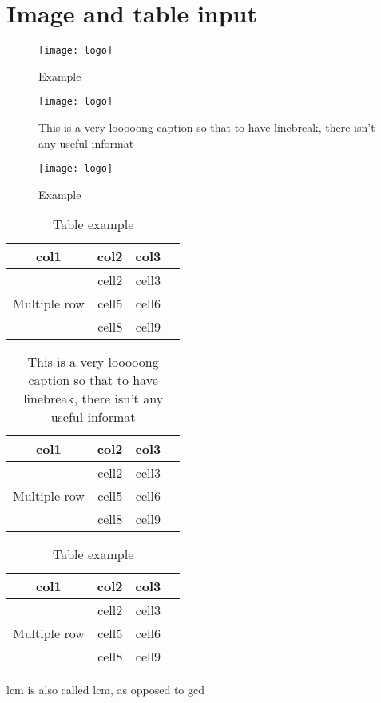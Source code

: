 \section{Image and table input}

\begin{figure}[H]
 \centering
 \texttt{[image: logo]}
 \caption{Example} 
\end{figure}

\begin{figure}[H]
 \centering
 \texttt{[image: logo]}
 \caption{This is a very looooong caption so that to have linebreak, there isn't any useful informat} 
\end{figure}

\begin{figure}[H]
 \centering
 \texttt{[image: logo]}
 \caption{Example} 
\end{figure}

\begin{table}[h]
\centering
\begin{tabular}{ |c|c|c|c| } 
\hline
col1 & col2 & col3 \\
\hline
\multirow{3}{4em}{Multiple row} & cell2 & cell3 \\ 
& cell5 & cell6 \\ 
& cell8 & cell9 \\ 
\hline
\end{tabular}
\caption{Table example}
\end{table}

\begin{table}[h]
\centering
\begin{tabular}{ |c|c|c|c| } 
\hline
col1 & col2 & col3 \\
\hline
\multirow{3}{4em}{Multiple row} & cell2 & cell3 \\ 
& cell5 & cell6 \\ 
& cell8 & cell9 \\ 
\hline
\end{tabular}
\caption{This is a very looooong caption so that to have linebreak, there isn't any useful informat}
\end{table}

\begin{table}[h]
\centering
\begin{tabular}{ |c|c|c|c| } 
\hline
col1 & col2 & col3 \\
\hline
\multirow{3}{4em}{Multiple row} & cell2 & cell3 \\ 
& cell5 & cell6 \\ 
& cell8 & cell9 \\ 
\hline
\end{tabular}
\caption{Table example}
\end{table}
\clearpage
\vspace*{0.5\textheight}
\acrshort{lcm} is also called \acrlong{lcm}, as opposed to \acrfull{gcd}
